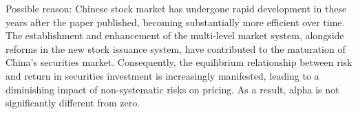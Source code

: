 Possible reason:
Chinese stock market has undergone rapid development in these years after the paper published, becoming substantially more efficient over time. The establishment and enhancement of the multi-level market system, alongside reforms in the new stock issuance system, have contributed to the maturation of China's securities market. Consequently, the equilibrium relationship between risk and return in securities investment is increasingly manifested, leading to a diminishing impact of non-systematic risks on pricing. As a result, alpha is not significantly different from zero.






